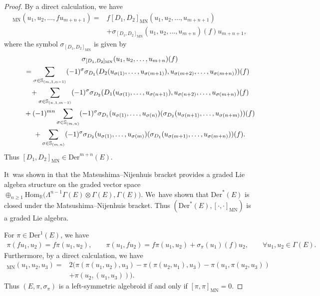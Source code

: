 \documentclass[pdftex]{sigma}%
\numberwithin{equation}{section}
\newcommand{\Real}{\mathbb R}
\newcommand{\Hom}{\mathrm{Hom}}
\newcommand{\Der}{\mathrm{Der}}
\newcommand{\MN}{\mathrm{MN}}
\begin{document}
\begin{proof}
By a direct calculation, we have
\begin{align*}
[D_1,D_2]_{\MN}(u_1,u_2,\dots,fu_{m+n+1})={}&f[D_1,D_2]_{\MN}(u_1,u_2,\dots,u_{m+n+1})
\\
&+\sigma_{[D_1,D_2]_{\MN}}(u_1,u_2,\dots,u_{m+n})(f)u_{m+n+1},
\end{align*}
where the symbol $\sigma_{[D_1,D_2]_{\MN}}$ is given by
\begin{gather*}
\sigma_{[D_1,D_2]_{\MN}}(u_1,u_2,\dots,u_{m+n})(f)
\\ \qquad
{}=\sum_{\sigma\in \mathbb{S}_{(m,1,n-1)}}(-1)^{\sigma}\sigma _{D_{1}}(D_{2}(u_{\sigma(1)},\dots,u_{\sigma(m+1)}),u_{\sigma(m+2)},\dots,u_{\sigma(m+n)}))(f)
\\ \qquad\hphantom{=}
{}+\sum_{\sigma\in \mathbb{S}_{(n,1,m-1)}}(-1)^{\sigma}\sigma_{D_{2}} (D_{1}(u_{\sigma(1)},\dots,u_{\sigma(n+1)}),u_{\sigma(n+2)},\dots,u_{\sigma(m+n)})(f)
\\ \qquad\hphantom{=}
{}+(-1)^{mn}\sum_{\sigma\in \mathbb{S}_{(m,n)}}(-1)^{\sigma}\sigma _{D_{1}}(u_{\sigma(1)},\dots,u_{\sigma(n)})(\sigma _{D_{2}}(u_{\sigma(n+1)},\dots,u_{\sigma(n+m)}))(f)
\\ \qquad\hphantom{=}
{}+\sum_{\sigma\in \mathbb{S}_{(m,n)}}(-1)^{\sigma}\sigma _{D_{2}}(u_{\sigma(1)},\dots,u_{\sigma(m)})(\sigma _{D_{1}}(u_{\sigma(m+1)},\dots,u_{\sigma(m+n)}))(f).
\end{gather*}
Thus $[D_1,D_2]_{\MN}\in\Der^{m+n}(E)$.

It~was shown in \cite{ChaLiv,Nijenhuis} that the Matsushima--Nijenhuis bracket provides a graded Lie algebra structure on the graded vector space $\oplus_{n\geq 1}\Hom_\Real\big(\Lambda^{n-1}\Gamma(E)\otimes\Gamma(E),\Gamma(E)\big)$. We~have shown that $\Der^*(E)$ is closed under the Matsushima--Nijenhuis bracket. Thus $(\Der^*(E),[\cdot,\cdot]_{\MN})$ is a graded Lie algebra.

For $\pi\in\Der^1(E)$, we have
\begin{gather*}
 \pi(fu_1,u_2)=f\pi(u_1,u_2),\qquad
 \pi(u_1,fu_2)=f\pi(u_1,u_2)+\sigma_\pi(u_1)(f)u_2,\qquad
 \forall u_1,u_2\in\Gamma(E).
\end{gather*}
Furthermore, by a direct calculation, we have
\begin{align*}
[\pi,\pi]_{\MN}(u_1,u_2,u_3)={}&2(\pi(\pi(u_1,u_2),u_3)-\pi(\pi(u_2,u_1),u_3)-\pi(u_1,\pi(u_2,u_3))
\\
&+\pi(u_2,(u_1,u_3))).
\end{align*}
Thus $(E,\pi,\sigma_\pi)$ is a left-symmetric algebroid if and only if $[\pi,\pi]_{\MN}=0$.
\end{proof}
\end{document}
